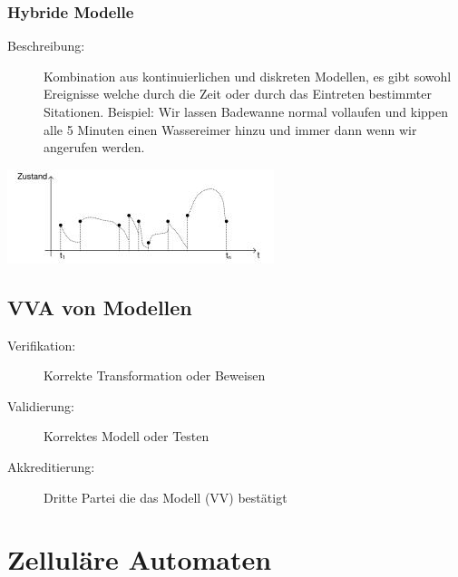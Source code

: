 \documentclass[11pt, fleqn, a4paper, leqno]{scrartcl} %
\begin{document}
		\subsubsection{Hybride Modelle}
			\begin{description}
				\item[Beschreibung:] Kombination aus kontinuierlichen und diskreten Modellen, es gibt sowohl Ereignisse welche durch die Zeit oder durch das Eintreten bestimmter Sitationen. Beispiel: Wir lassen Badewanne normal vollaufen und kippen alle 5 Minuten einen Wassereimer hinzu und immer dann wenn wir angerufen werden.
			\end{description}
			\begin{center}
				\includegraphics [scale=0.6]{images/hybrid.jpg}
			\end{center}
	\subsection{VVA von Modellen}
		\begin{description}
			\item[Verifikation:] Korrekte Transformation oder Beweisen
			\item[Validierung:] Korrektes Modell oder Testen
			\item[Akkreditierung:] Dritte Partei die das Modell (VV) bestätigt
		\end{description}
\section{Zelluläre Automaten}
\end{document}
